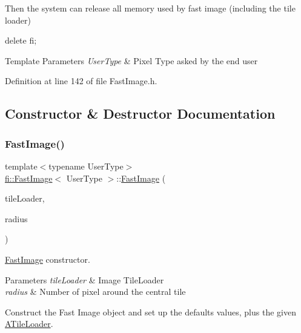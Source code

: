 Then the system can release all memory used by fast image (including the tile loader) 
\begin{DoxyCode}
\textcolor{keyword}{delete} fi;
\end{DoxyCode}



\begin{DoxyTemplParams}{Template Parameters}
{\em User\+Type} & Pixel Type asked by the end user \\
\hline
\end{DoxyTemplParams}


Definition at line 142 of file Fast\+Image.\+h.



\subsection{Constructor \& Destructor Documentation}
\mbox{\label{classfi_1_1FastImage_a1ac7484406bb49b685b27cab0ea2cbcf}} 
\subsubsection{\texorpdfstring{Fast\+Image()}{FastImage()}\hspace{0.1cm}{\footnotesize\ttfamily [1/2]}}
{\footnotesize\ttfamily template$<$typename User\+Type$>$ \\
\hyperlink{classfi_1_1FastImage}{fi\+::\+Fast\+Image}$<$ User\+Type $>$\+::\hyperlink{classfi_1_1FastImage}{Fast\+Image} (\begin{DoxyParamCaption}\item[{\hyperlink{classfi_1_1ATileLoader}{A\+Tile\+Loader}$<$ User\+Type $>$ $\ast$}]{tile\+Loader,  }\item[{const uint32\+\_\+t \&}]{radius }\end{DoxyParamCaption})\hspace{0.3cm}{\ttfamily [inline]}}



\hyperlink{classfi_1_1FastImage}{Fast\+Image} constructor. 


\begin{DoxyParams}{Parameters}
{\em tile\+Loader} & Image Tile\+Loader \\
\hline
{\em radius} & Number of pixel around the central tile\\
\hline
\end{DoxyParams}
Construct the Fast Image object and set up the defaults values, plus the given \hyperlink{classfi_1_1ATileLoader}{A\+Tile\+Loader}. 

